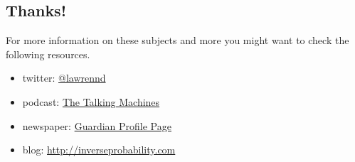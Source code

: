\documentclass[a4paperpaper,]{article}
\providecommand{\tightlist}{%
  \setlength{\itemsep}{0pt}\setlength{\parskip}{0pt}}
\begin{document}
\hypertarget{thanks}{%
\subsection{Thanks!}\label{thanks}}

For more information on these subjects and more you might want to check
the following resources.

\begin{itemize}
\tightlist
\item
  twitter: \href{https://twitter.com/lawrennd}{@lawrennd}
\item
  podcast: \href{http://thetalkingmachines.com}{The Talking Machines}
\item
  newspaper:
  \href{http://www.theguardian.com/profile/neil-lawrence}{Guardian
  Profile Page}
\item
  blog:
  \href{http://inverseprobability.com/blog.html}{http://inverseprobability.com}
\end{itemize}



\end{document}
